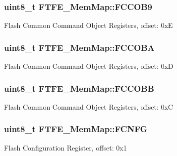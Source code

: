\subsubsection[{F\+C\+C\+O\+B9}]{\setlength{\rightskip}{0pt plus 5cm}uint8\+\_\+t F\+T\+F\+E\+\_\+\+Mem\+Map\+::\+F\+C\+C\+O\+B9}\label{struct_f_t_f_e___mem_map_abd479b210960b55ac943bdc01be221c1}
Flash Common Command Object Registers, offset\+: 0x\+E \hypertarget{struct_f_t_f_e___mem_map_ab5fa4c4c247ee0b9798e7cfc904a2d8b}{}
\subsubsection[{F\+C\+C\+O\+B\+A}]{\setlength{\rightskip}{0pt plus 5cm}uint8\+\_\+t F\+T\+F\+E\+\_\+\+Mem\+Map\+::\+F\+C\+C\+O\+B\+A}\label{struct_f_t_f_e___mem_map_ab5fa4c4c247ee0b9798e7cfc904a2d8b}
Flash Common Command Object Registers, offset\+: 0x\+D \hypertarget{struct_f_t_f_e___mem_map_a1eed87dc0da91bf3023c90b7fcd894f4}{}
\subsubsection[{F\+C\+C\+O\+B\+B}]{\setlength{\rightskip}{0pt plus 5cm}uint8\+\_\+t F\+T\+F\+E\+\_\+\+Mem\+Map\+::\+F\+C\+C\+O\+B\+B}\label{struct_f_t_f_e___mem_map_a1eed87dc0da91bf3023c90b7fcd894f4}
Flash Common Command Object Registers, offset\+: 0x\+C \hypertarget{struct_f_t_f_e___mem_map_ac8a0419a834abb8966d8ca7d18384d7e}{}
\subsubsection[{F\+C\+N\+F\+G}]{\setlength{\rightskip}{0pt plus 5cm}uint8\+\_\+t F\+T\+F\+E\+\_\+\+Mem\+Map\+::\+F\+C\+N\+F\+G}\label{struct_f_t_f_e___mem_map_ac8a0419a834abb8966d8ca7d18384d7e}
Flash Configuration Register, offset\+: 0x1 \hypertarget{struct_f_t_f_e___mem_map_aab8bdf05ca369ec198ec06cc6c08c54e}{}
